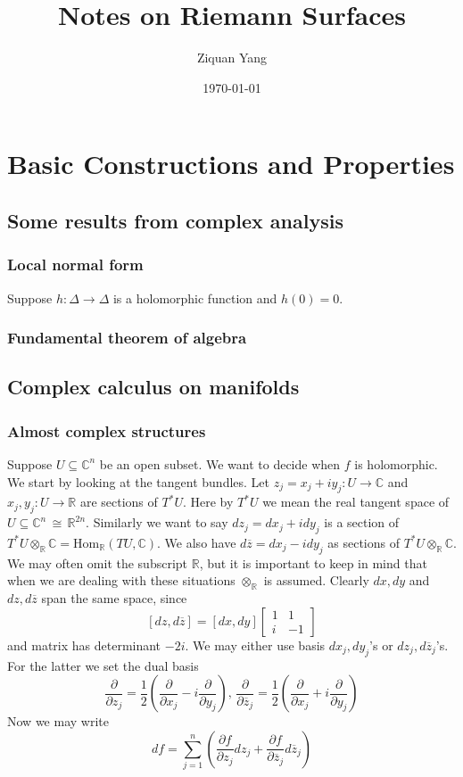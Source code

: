\documentclass[12pt]{article}
\theoremstyle{plain}
\theoremstyle{definition}
\newcommand{\IC}{\mathbb{C}}
\newcommand{\IR}{\mathbb{R}}
\newcommand{\Hom}{\mathrm{Hom}}
\newcommand\iso{{\, \cong \,}}
\newcommand\tensor{{\otimes}}
\newcommand{\<}{\langle}
\renewcommand{\>}{\rangle}
\newcommand{\p}{\partial}
\newcommand{\half}{\frac{1}{2}}
\newcommand{\bz}{\overline{z}}
\newcommand{\ddzj}{\frac{\p}{\p z_j}}
\newcommand{\ddbzj}{\frac{\p}{\p \bz_j}}
\newcommand{\ddxj}{\frac{\p}{\p x_j}}
\newcommand{\ddyj}{\frac{\p}{\p y_j}}
\begin{document}
%

\title{Notes on Riemann Surfaces}
\author{Ziquan Yang}


\date{\today}

\maketitle
 
\tableofcontents

\setcounter{section}{0}
\section{Basic Constructions and Properties}

\subsection{Some results from complex analysis}
\subsubsection{Local normal form}
Suppose $h : \Delta \to \Delta$ is a holomorphic function and $h(0) = 0$. 

\subsubsection{Fundamental theorem of algebra}
\subsection{Complex calculus on manifolds}

\subsubsection{Almost complex structures}
Suppose $U \subseteq \IC^n$ be an open subset. We want to decide when $f$ is holomorphic. We start by looking at the tangent bundles. Let $z_j = x_j + iy_j : U \to \IC$ and $x_j, y_j : U \to \IR$ are sections of $T^* U$. Here by $T^* U$ we mean the real tangent space of $U \subseteq \IC^n \iso \IR^{2n}$. Similarly we want to say $dz_j = dx_j + i dy_j$ is a section of $T^* U \tensor_\IR \IC = \Hom_\IR(TU, \IC)$. We also have $d\bz = dx_j - i dy_j$ as sections of $T^* U \tensor_\IR \IC$. We may often omit the subscript $\IR$, but it is important to keep in mind that when we are dealing with these situations $\tensor_\IR$ is assumed. Clearly $dx, dy$ and $dz, d\bz$ span the same space, since
$$ [dz, d\bz] = [dx, dy] \begin{bmatrix}
1 & 1 \\ i & -1 
\end{bmatrix}  $$
and matrix has determinant $-2i$. We may either use basis $dx_j, dy_j$'s or $dz_j, d\bz_j$'s. For the latter we set the dual basis
$$ \ddzj = \half( \ddxj - i \ddyj ), \, \ddbzj = \half (\ddxj + i \ddyj) $$
Now we may write 
$$ df = \sum_{j = 1}^n (\frac{\p f}{\p z_j} dz_j + \frac{\p f}{\p \bz_j} d
\bz_j) $$
\end{document}
